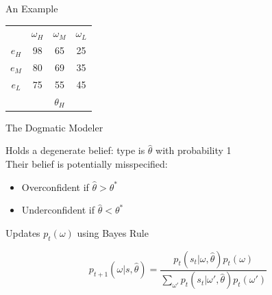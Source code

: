 \documentclass[aspectratio=169]{beamer}
\begin{document}
\begin{frame}{An Example}
\begin{tabular}{ c|c|c|c|}
    \multicolumn{1}{c}{} & \multicolumn{1}{c}{$\omega_H$} & \multicolumn{1}{c}{$\omega_M$} & \multicolumn{1}{c}{$\omega_L$}\\
    \cline{2-4}
    $e_H$ & 98 & 65 & 25 \\
    \cline{2-4}
    $e_M$ & 80 & 69 & 35 \\
    \cline{2-4}
    $e_L$ & 75 & 55 & 45 \\
    \cline{2-4}
    \multicolumn{1}{c}{} & \multicolumn{1}{c}{} & \multicolumn{1}{c}{$\theta_H$} & \multicolumn{1}{c}{}\\
    \end{tabular}
    
\end{frame}


\begin{frame}{The Dogmatic Modeler}

    Holds a degenerate belief: type is $\hat{\theta}$ with probability 1\\
    \bigskip
    Their belief is potentially misspecified:\\
    \begin{itemize}
        \item Overconfident if $\hat{\theta}>\theta^*$
        \item Underconfident if $\hat{\theta}<\theta^*$
    \end{itemize}
    \bigskip
    Updates $p_t(\omega)$ using Bayes Rule

    $$p_{t+1}(\omega|s, \hat{\theta}) = \frac{p_t(s_t|\omega, \hat{\theta})p_{t}(\omega)}{\sum_{\omega'}p_t(s_t|\omega', \hat{\theta})p_{t}(\omega')}$$
    
\end{frame}
\end{document}
